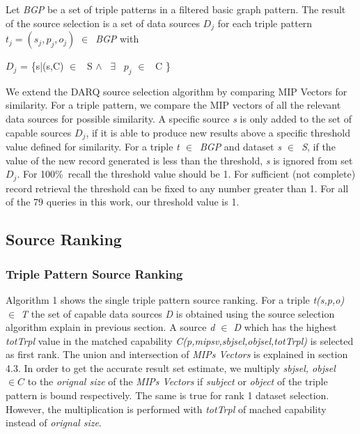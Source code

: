 \documentclass{sig-alternate}  %
\begin{document}
Let \emph{BGP} be a set of triple
patterns in a filtered basic graph pattern. The result of the source
selection is a set of data sources $D_j$ for each triple
pattern $t_j = (s_j, p_j, o_j)$ $\in$\ \emph{BGP} with 

\begin{center}
$D_j$ = \{s|(s,C) $\in$ \ S $\wedge$ \ $\exists$
\ $p_j$ $\in$ \ C \}
\par\end{center}

We extend the DARQ source selection algorithm by comparing MIP Vectors
 for similarity. For a triple pattern, we compare the MIP
vectors of all the relevant data sources for possible similarity.
A specific source \emph{s} is only added to the set of capable sources $D_j$,
if it is able to produce new results above a specific threshold value
defined for similarity. For a triple \emph{t $\in$\ BGP} and dataset \emph{s $\in$\ S}, if the value of the new record generated
is less than the threshold, \emph{s} is ignored from set $D_j$. For 100\%\ recall the threshold value should be 1. For sufficient (not complete) record retrieval the threshold can be fixed to any number greater than 1. For all of the 79 queries in this work, our threshold value is 1. 

\subsection{Source Ranking} 
\subsubsection{Triple Pattern Source Ranking}
Algorithm 1 shows the single triple pattern source ranking. For a triple \emph{t(s,p,o) $\in$ T } the set of capable data sources \emph{D} is obtained using the source selection algorithm explain in previous section. A source \emph{d $\in$ D} which has the highest \emph{totTrpl} value in the matched capability \emph{C(p,mipsv,sbjsel,objsel,totTrpl)} is selected as first rank. The union and intersection of \emph{MIPs Vectors} is explained in section 4.3. In order to get the accurate result set estimate, we multiply \emph{sbjsel, objsel $\in C$} to the \emph{orignal size} of the \emph{MIPs Vectors} if \emph{subject} or \emph{object} of the triple pattern is bound respectively. The same is true for rank 1 dataset selection. However, the multiplication is performed with \emph{totTrpl} of mached capability instead of \emph{orignal size}. 
\end{document}

